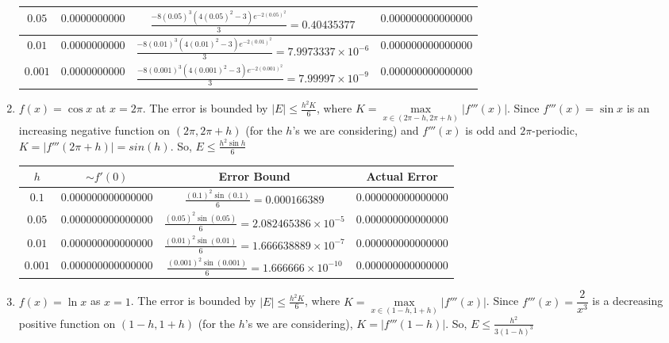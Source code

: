 \documentclass[12pt]{article}
\begin{document}
\begin{enumerate}[\ \ (a)\ \ ]
\begin{table}[H]
\begin{tabular}{||c|c|c|c||}
            $0.05$ & $0.0000000000$ & $\frac{-8(0.05)^3(4(0.05)^2 - 3)e^{-2(0.05)^2}}{3} = 0.40435377$ & $0.000000000000000$ \\ \hline
            $0.01$ & $0.0000000000$ & $\frac{-8(0.01)^3(4(0.01)^2 - 3)e^{-2(0.01)^2}}{3} = 7.9973337 \times 10^{-6}$ & $0.000000000000000$ \\ \hline
            $0.001$ & $0.0000000000$ & $\frac{-8(0.001)^3(4(0.001)^2 - 3)e^{-2(0.001)^2}}{3} = 7.99997 \times 10^{-9}$ & $0.000000000000000$ \\ \hline \hline
        \end{tabular}
    \end{table}
    \item $f(x) = \cos{x}$ at $x = 2\pi$.
    The error is bounded by $|E| \leq \displaystyle\frac{h^2K}{6}$, where $K = \max\limits_{x\in(2\pi - h, 2\pi + h)}\left|f'''(x)\right|$.  Since $f'''(x) = \sin{x}$ is an increasing negative function on $(2\pi, 2\pi + h)$ (for the $h$'s we are considering) and $f'''(x)$ is odd and $2\pi$-periodic, $K = |f'''(2\pi + h)| = sin(h)$.  So, $E \leq \displaystyle\frac{h^2\sin{h}}{6}$
    \begin{table}[H]
        \begin{tabular}{||c|c|c|c||} \hline\hline
            $h$ & $\sim f'(0)$ & {\bf Error Bound} & {\bf Actual Error} \\ \hline
            $0.1$ & $0.000000000000000$ & $\frac{(0.1)^2\sin{(0.1)}}{6} = 0.000166389$ & $0.000000000000000$ \\ \hline
            $0.05$ & $0.000000000000000$ & $\frac{(0.05)^2\sin{(0.05)}}{6} = 2.082465386 \times 10^{-5}$ & $0.000000000000000$ \\ \hline
            $0.01$ & $0.000000000000000$ & $\frac{(0.01)^2\sin{(0.01)}}{6} = 1.666638889 \times 10^{-7}$ & $0.000000000000000$ \\ \hline
            $0.001$ & $0.000000000000000$ & $\frac{(0.001)^2\sin{(0.001)}}{6} = 1.666666 \times 10^{-10}$ & $0.000000000000000$ \\ \hline \hline
        \end{tabular}
    \end{table}
    \item $f(x) = \ln{x}$ as $x = 1$.
    The error is bounded by $|E| \leq \displaystyle\frac{h^2K}{6}$, where $K = \max\limits_{x\in(1 - h, 1 + h)}\left|f'''(x)\right|$.  Since $f'''(x) = \dfrac{2}{x^3}$ is a decreasing positive function on $(1 - h, 1 + h)$ (for the $h$'s we are considering), $K = |f'''(1 - h)|$.  So, $E \leq \displaystyle\frac{h^2}{3(1 - h)^3}$

\end{enumerate}
\end{document}
